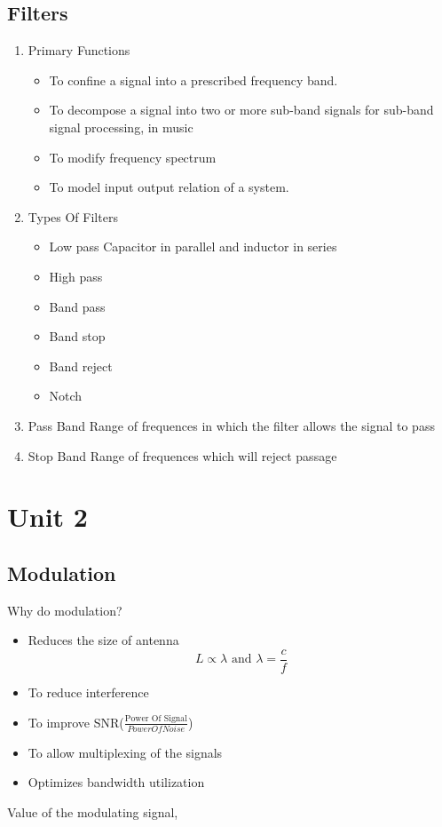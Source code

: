 \documentclass[11pt]{report}
\begin{document}
\section{Filters}
\label{sec:orgcd435f2}
\begin{enumerate}
\item Primary Functions
\label{sec:org250d6c8}
\begin{itemize}
\item To confine a signal into a prescribed frequency band.
\item To decompose a signal into two or more sub-band signals for sub-band signal processing, in music
\item To modify frequency spectrum
\item To model input output relation of a system.
\end{itemize}
\item Types Of Filters
\label{sec:orge1ab688}
\begin{itemize}
\item Low pass
Capacitor in parallel and inductor in series
\item High pass
\item Band pass
\item Band stop
\item Band reject
\item Notch
\end{itemize}
\item Pass Band
\label{sec:org05f39e5}
Range of frequences in which the filter allows the signal to pass
\item Stop Band
\label{sec:org00be9e7}
Range of frequences which will reject passage
\end{enumerate}
\chapter{Unit 2}
\label{sec:org5bdaffd}
\section{Modulation}
\label{sec:org9d60fdd}
Why do modulation?
\begin{itemize}
\item Reduces the size of antenna $$L \propto \lambda \text{ and } \lambda = \frac{c}{f}$$

\item To reduce interference
\item To improve SNR(\(\frac{\text{Power Of Signal}}{{Power Of Noise}}\))
\item To allow multiplexing of the signals
\item Optimizes bandwidth utilization
\end{itemize}
Value of the modulating signal,
\end{document}
